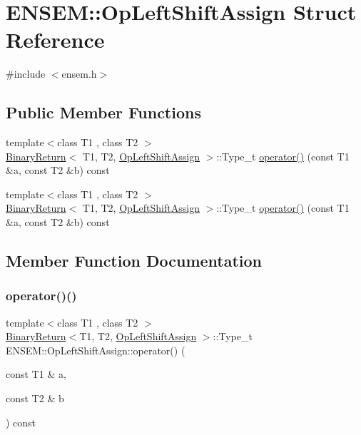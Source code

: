 \hypertarget{structENSEM_1_1OpLeftShiftAssign}{}\section{E\+N\+S\+EM\+:\+:Op\+Left\+Shift\+Assign Struct Reference}
\label{structENSEM_1_1OpLeftShiftAssign}


{\ttfamily \#include $<$ensem.\+h$>$}

\subsection*{Public Member Functions}
\begin{DoxyCompactItemize}
\item 
{\footnotesize template$<$class T1 , class T2 $>$ }\\\mbox{\hyperlink{structENSEM_1_1BinaryReturn}{Binary\+Return}}$<$ T1, T2, \mbox{\hyperlink{structENSEM_1_1OpLeftShiftAssign}{Op\+Left\+Shift\+Assign}} $>$\+::Type\+\_\+t \mbox{\hyperlink{structENSEM_1_1OpLeftShiftAssign_a777be5cb8e7641c4a6b448b0ccf1b745}{operator()}} (const T1 \&a, const T2 \&b) const
\item 
{\footnotesize template$<$class T1 , class T2 $>$ }\\\mbox{\hyperlink{structENSEM_1_1BinaryReturn}{Binary\+Return}}$<$ T1, T2, \mbox{\hyperlink{structENSEM_1_1OpLeftShiftAssign}{Op\+Left\+Shift\+Assign}} $>$\+::Type\+\_\+t \mbox{\hyperlink{structENSEM_1_1OpLeftShiftAssign_a777be5cb8e7641c4a6b448b0ccf1b745}{operator()}} (const T1 \&a, const T2 \&b) const
\end{DoxyCompactItemize}


\subsection{Member Function Documentation}
\mbox{\label{structENSEM_1_1OpLeftShiftAssign_a777be5cb8e7641c4a6b448b0ccf1b745}} 
\subsubsection{\texorpdfstring{operator()()}{operator()()}\hspace{0.1cm}{\footnotesize\ttfamily [1/2]}}
{\footnotesize\ttfamily template$<$class T1 , class T2 $>$ \\
\mbox{\hyperlink{structENSEM_1_1BinaryReturn}{Binary\+Return}}$<$T1, T2, \mbox{\hyperlink{structENSEM_1_1OpLeftShiftAssign}{Op\+Left\+Shift\+Assign}} $>$\+::Type\+\_\+t E\+N\+S\+E\+M\+::\+Op\+Left\+Shift\+Assign\+::operator() (\begin{DoxyParamCaption}\item[{const T1 \&}]{a,  }\item[{const T2 \&}]{b }\end{DoxyParamCaption}) const\hspace{0.3cm}{\ttfamily [inline]}}

